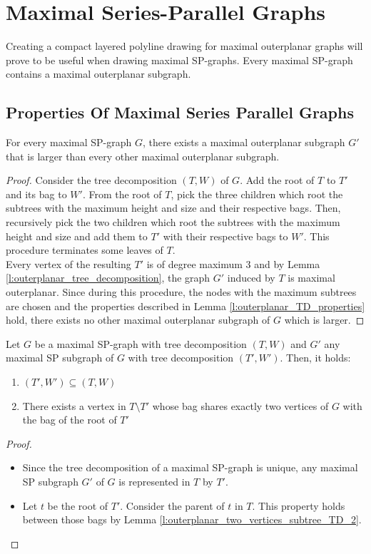 \section{Maximal Series-Parallel Graphs}\label{section:SP-graphs}

Creating a compact layered polyline drawing for maximal outerplanar graphs will prove to be useful when drawing maximal SP-graphs. Every maximal SP-graph contains a maximal outerplanar subgraph. 

\subsection{Properties Of Maximal Series Parallel Graphs}


\begin{lemma}
	For every maximal SP-graph $G$, there exists a maximal outerplanar subgraph $G'$ that is larger than every other maximal outerplanar subgraph.
\end{lemma}
\begin{proof}
	Consider the tree decomposition $(T,W)$ of $G$. Add the root of $T$ to $T'$ and its bag to $W'$. From the root of $T$, pick the three children which root the subtrees with the maximum height and size and their respective bags. Then, recursively pick the two children which root the subtrees with the maximum height and size and add them to $T'$ with their respective bags to $W'$. This procedure terminates some leaves of $T$.\\
	Every vertex of the resulting $T'$ is of degree maximum 3 and by Lemma \ref{l:outerplanar_tree_decomposition}, the graph $G'$ induced by $T$ is maximal outerplanar. Since during this procedure, the nodes with the maximum subtrees are chosen and the properties described in Lemma \ref{l:outerplanar_TD_properties} hold, there exists no other maximal outerplanar subgraph of $G$ which is larger. 
\end{proof}

\begin{lemma}
	Let $G$ be a maximal SP-graph with tree decomposition $(T,W)$ and $G'$ any maximal SP subgraph of $G$ with tree decomposition $(T',W')$. Then, it holds:
	\begin{enumerate}
		\item $(T',W') \subseteq (T,W)$
		\item There exists a vertex in $T\setminus T'$ whose bag shares exactly two vertices of $G$ with the bag of the root of $T'$
	\end{enumerate}
\end{lemma}	
\begin{proof}
	\begin{itemize}
		\item Since the tree decomposition of a maximal SP-graph is unique, any maximal SP subgraph $G'$ of $G$ is represented in $T$ by $T'$.
		\item Let $t$ be the root of $T'$. Consider the parent of $t$ in $T$. This property holds between those bags by Lemma \ref{l:outerplanar_two_vertices_subtree_TD_2}.
	\end{itemize}
\end{proof}

